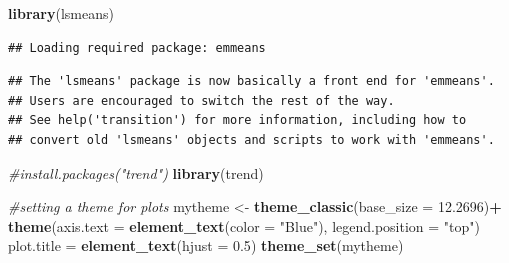 \documentclass[12pt,]{article}
\newenvironment{Shaded}{\begin{snugshade}}{\end{snugshade}}
\newcommand{\KeywordTok}[1]{\textcolor[rgb]{0.13,0.29,0.53}{\textbf{#1}}}
\newcommand{\DataTypeTok}[1]{\textcolor[rgb]{0.13,0.29,0.53}{#1}}
\newcommand{\FloatTok}[1]{\textcolor[rgb]{0.00,0.00,0.81}{#1}}
\newcommand{\StringTok}[1]{\textcolor[rgb]{0.31,0.60,0.02}{#1}}
\newcommand{\CommentTok}[1]{\textcolor[rgb]{0.56,0.35,0.01}{\textit{#1}}}
\newcommand{\OperatorTok}[1]{\textcolor[rgb]{0.81,0.36,0.00}{\textbf{#1}}}
\newcommand{\NormalTok}[1]{#1}
\begin{document}
\begin{Shaded}
\begin{Highlighting}[]
\KeywordTok{library}\NormalTok{(lsmeans)}
\end{Highlighting}
\end{Shaded}

\begin{verbatim}
## Loading required package: emmeans
\end{verbatim}

\begin{verbatim}
## The 'lsmeans' package is now basically a front end for 'emmeans'.
## Users are encouraged to switch the rest of the way.
## See help('transition') for more information, including how to
## convert old 'lsmeans' objects and scripts to work with 'emmeans'.
\end{verbatim}

\begin{Shaded}
\begin{Highlighting}[]
\CommentTok{#install.packages("trend")}
\KeywordTok{library}\NormalTok{(trend)}

\CommentTok{#setting a theme for plots}
\NormalTok{mytheme <-}\StringTok{ }\KeywordTok{theme_classic}\NormalTok{(}\DataTypeTok{base_size =} \FloatTok{12.2696}\NormalTok{)}\OperatorTok{+}
\StringTok{  }\KeywordTok{theme}\NormalTok{(}\DataTypeTok{axis.text =} \KeywordTok{element_text}\NormalTok{(}\DataTypeTok{color =} \StringTok{"Blue"}\NormalTok{),}
  \DataTypeTok{legend.position =} \StringTok{"top"}\NormalTok{)}
\NormalTok{  plot.title =}\StringTok{ }\KeywordTok{element_text}\NormalTok{(}\DataTypeTok{hjust =} \FloatTok{0.5}\NormalTok{)}
\KeywordTok{theme_set}\NormalTok{(mytheme)}
\end{Highlighting}
\end{Shaded}

\begin{Shaded}
\end{Shaded}
\end{document}
